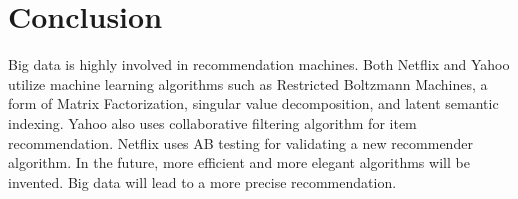 \documentclass[sigconf]{acmart}
\begin{document}
\section{Conclusion}
Big data is highly involved in recommendation machines.  Both Netflix and Yahoo utilize machine learning algorithms such as Restricted Boltzmann Machines, a form of Matrix Factorization, singular value decomposition, and latent semantic indexing. Yahoo also uses collaborative filtering algorithm for item recommendation. Netflix uses AB testing for validating a new recommender algorithm. In the future, more efficient and more elegant algorithms will be invented. Big data will lead to a more precise recommendation.  


 
\end{document}
